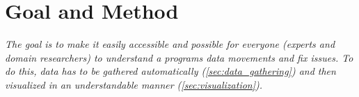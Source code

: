 \section{Goal and Method}\label{sec:goals}
\textit{The goal is to make it easily accessible and possible for everyone (experts and domain researchers) to understand a programs data movements and fix issues. To do this, data has to be gathered automatically (\ref{sec:data_gathering}) and then visualized in an understandable manner (\ref{sec:visualization}).}

